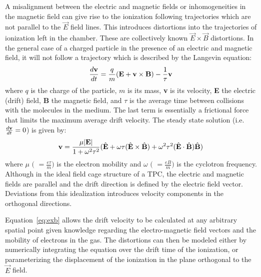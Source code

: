 \documentclass[twoside]{article}
\begin{document}
A misalignment between the electric and magnetic fields
or inhomogeneities in the magnetic field can
give rise to the ionization following trajectories which are not 
parallel to the $\vec{E}$ field lines.  This introduces distortions
into the trajectories of ionization left in the chamber.  These are
collectively known $\vec{E} \times \vec{B}$ distortions.
In the general case of a charged particle in the presence of an 
electric and magnetic field, it will not follow a trajectory
which is described by the Langevin equation:
\begin{equation}
\frac{d{\bf v}}{dt} = \frac{q}{m}({\bf E} + {\bf v} \times {\bf B}) - \frac{1}{\tau} {\bf v}
\label{eq:lang}
\end{equation}
where $q$ is the charge of the particle, $m$ is its mass, {\bf v} is 
its velocity, {\bf E} the electric (drift) field, {\bf B} the 
magnetic field, and $\tau$ is the average time between collisions 
with the molecules in the medium.  The last term is essentially 
a frictional force that limits the maximum average drift velocity.  
The steady state solution (i.e.~$\frac{d{\bf v}}{dt} = 0$) is given by:
\begin{equation}
{\bf v} = \frac{\mu |{\bf E}| }{1 + \omega ^{2} \tau ^{2}} ( \hat{\bf E} + \omega  \tau   (\hat{\bf E} \times \hat{\bf B})  + \omega ^{2} \tau ^{2}(\hat{\bf E} \cdot \hat{\bf B} )\hat{\bf B})
\label{eq:exb}
\end{equation}
where $\mu$ $($ $= \frac{e \tau}{m})$ is the electron mobility 
and $\omega$ $($ $= \frac{e B}{m})$ is the cyclotron frequency.  
Although in the ideal field cage structure of a TPC, the electric and
magnetic fields are parallel and the drift direction is defined
by the electric field vector.  Deviations from this idealization
introduces velocity components in the orthogonal directions.

Equation~\ref{eq:exb} allows the drift velocity to be calculated at any
arbitrary spatial point given knowledge regarding the electro-magnetic
field vectors and the mobility of electrons in the gas.
The distortions can then be modeled either by numerically
integrating the equation over the drift time of the ionization, or
parameterizing the displacement of the ionization in the plane
orthogonal to the $\vec{E}$ field.
\end{document}

